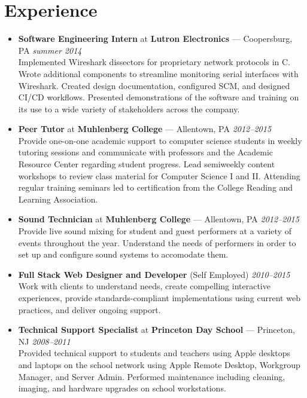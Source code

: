 \documentclass[11pt]{article}
\begin{document}
\section*{Experience}
\begin{itemize}
  \item \textbf{Software Engineering Intern} at \textbf{Lutron Electronics} --- Coopersburg, PA \hfill {\em summer 2014} \\
    Implemented Wireshark dissectors for proprietary network protocols in C. Wrote additional components to streamline monitoring serial interfaces with Wireshark. Created design documentation, configured SCM, and designed CI/CD workflows. Presented demonstrations of the software and training on its use to a wide variety of stakeholders across the company.

  \item \textbf{Peer Tutor} at \textbf{Muhlenberg College} --- Allentown, PA \hfill {\em 2012--2015} \\
    Provide one-on-one academic support to computer science students in weekly tutoring sessions and communicate with professors and the Academic Resource Center regarding student progress. Lead semiweekly content workshops to review class material for Computer Science I and II. Attending regular training seminars led to certification from the College Reading and Learning Association.

  \item \textbf{Sound Technician} at \textbf{Muhlenberg College} --- Allentown, PA \hfill {\em 2012--2015} \\
    Provide live sound mixing for student and guest performers at a variety of events throughout the year. Understand the needs of performers in order to set up and configure sound systems to accomodate them.

  \item \textbf{Full Stack Web Designer and Developer} (Self Employed) \hfill {\em 2010--2015} \\
    Work with clients to understand needs, create compelling interactive experiences, provide standards-compliant implementations using current web practices, and deliver ongoing support.

  \item \textbf{Technical Support Specialist} at \textbf{Princeton Day School} --- Princeton, NJ \hfill {\em 2008--2011} \\
    Provided technical support to students and teachers using Apple desktops and laptops on the school network using Apple Remote Desktop, Workgroup Manager, and Server Admin. Performed maintenance including cleaning, imaging, and hardware upgrades on school workstations.
\end{itemize}
\end{document}
